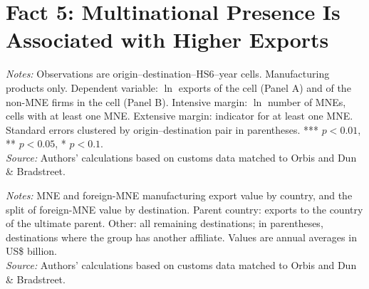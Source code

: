 \documentclass[11pt,a4paper]{article}
\begin{document}
\section{Fact 5: Multinational Presence Is Associated with Higher Exports}\label{sec:f5_manufacturing}
\begin{table}[H]\centering\small%
  \caption{Manufacturing: Multinational Presence and Exports}%
  \label{tab:t1_manufacturing}%
  \par\vspace{3pt}%
  \begin{minipage}{0.95\textwidth}\footnotesize %
  \textit{Notes:} Observations are origin--destination--HS6--year cells. Manufacturing products only. Dependent variable: $\ln$ exports of the cell (Panel A) and of the non-MNE firms in the cell (Panel B). Intensive margin: $\ln$ number of MNEs, cells with at least one MNE. Extensive margin: indicator for at least one MNE. Standard errors clustered by origin--destination pair in parentheses. *** $p<0.01$, ** $p<0.05$, * $p<0.1$.\\[3pt]%
  \textit{Source:} Authors' calculations based on customs data matched to Orbis and Dun \& Bradstreet.%
  \end{minipage}%
  \end{table}
\begin{table}[H]\centering\small%
  \caption{Manufacturing: Multinational Exports by Exporting Country and Destination Type}%
  \label{tab:pres_manufacturing}%
  \par\vspace{3pt}%
  \begin{minipage}{0.95\textwidth}\footnotesize %
  \textit{Notes:} MNE and foreign-MNE manufacturing export value by country, and the split of foreign-MNE value by destination. Parent country: exports to the country of the ultimate parent. Other: all remaining destinations; in parentheses, destinations where the group has another affiliate. Values are annual averages in US\$ billion.\\[3pt]%
  \textit{Source:} Authors' calculations based on customs data matched to Orbis and Dun \& Bradstreet.%
  \end{minipage}%
  \end{table}
\end{document}
